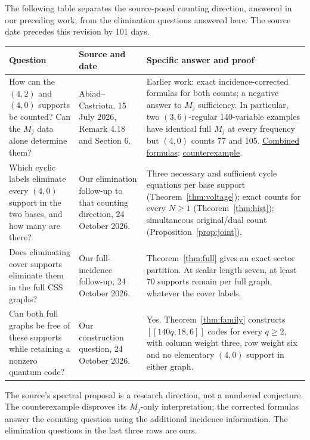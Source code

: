 \documentclass[11pt]{article}
\newcommand{\priorproof}[2]{\href{https://github.com/alectionary/vibe-math/blob/41307a70c2c0952e2222ee20ae4517a9b046030f/formalization/absorbing-four-zero/#1.lean}{#2}}
\begin{document}
The following table separates the source-posed counting direction, answered
in our preceding work, from the elimination questions answered here. The
source date precedes this revision by 101 days.
\begin{longtable}{@{}>{\raggedright\arraybackslash}p{}>{\raggedright\arraybackslash}p{}>{\raggedright\arraybackslash}p{}@{}}
\toprule Question&Source and date&Specific answer and proof\\\midrule\endhead
How can the $(4,2)$ and $(4,0)$ supports be counted? Can the $M_j$ data alone determine them?&
Abiad--Castriota, 15 July 2026, Remark 4.18 and Section 6.&
Earlier work: exact incidence-corrected formulas for both counts; a negative
answer to $M_j$ sufficiency. In particular, two $(3,6)$-regular 140-variable
examples have identical full $M_j$ at every frequency but $(4,0)$ counts
77 and 105. \priorproof{AbsorbingFourCounts}{Combined formulas};
\priorproof{PaschCubicTrade}{counterexample}.\\[4pt]
Which cyclic labels eliminate every $(4,0)$ support in the two bases, and how many are there?&
Our elimination follow-up to that counting direction, 24 October 2026.&
Three necessary and sufficient cycle equations per base support
(Theorem~\ref{thm:voltage}); exact counts for every $N\geq1$
(Theorem~\ref{thm:hist}); simultaneous original/dual count
(Proposition~\ref{prop:joint}).\\[4pt]
Does eliminating cover supports eliminate them in the full CSS graphs?&
Our full-incidence follow-up, 24 October 2026.&
Theorem~\ref{thm:full} gives an exact sector partition. At scalar length seven,
at least 70 supports remain per full graph, whatever the cover labels.\\[4pt]
Can both full graphs be free of these supports while retaining a nonzero quantum code?&
Our construction question, 24 October 2026.&
Yes. Theorem~\ref{thm:family} constructs $[[140q,18,6]]$ codes for every
$q\geq2$, with column weight three, row weight six and no elementary
$(4,0)$ support in either graph.\\
\bottomrule
\end{longtable}
The source's spectral proposal is a research direction, not a numbered
conjecture. The counterexample disproves its $M_j$-only interpretation; the
corrected formulas answer the counting question using the additional incidence
information. The elimination questions in the last three rows are ours.
\end{document}
